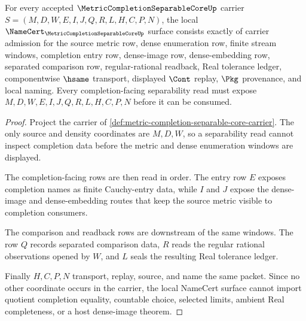 \begin{theorem}
\label{thm:metric-completion-separable-core-namecert-obligations}
For every accepted $\MetricCompletionSeparableCoreUp$ carrier $S=(M,D,W,E,I,J,Q,R,L,H,C,P,N)$, the local $\NameCert_{\MetricCompletionSeparableCoreUp}$ surface consists exactly of carrier admission for the source metric row, dense enumeration row, finite stream windows, completion entry row, dense-image row, dense-embedding row, separated comparison row, regular-rational readback, Real tolerance ledger, componentwise $\hsame$ transport, displayed $\Cont$ replay, $\Pkg$ provenance, and local naming. Every completion-facing separability read must expose $M,D,W,E,I,J,Q,R,L,H,C,P,N$ before it can be consumed.
\end{theorem}
\begin{proof}
Project the carrier of \autoref{def:metric-completion-separable-core-carrier}. The only source and density coordinates are $M,D,W$, so a separability read cannot inspect completion data before the metric and dense enumeration windows are displayed.

The completion-facing rows are then read in order. The entry row $E$ exposes completion names as finite Cauchy-entry data, while $I$ and $J$ expose the dense-image and dense-embedding routes that keep the source metric visible to completion consumers.

The comparison and readback rows are downstream of the same windows. The row $Q$ records separated comparison data, $R$ reads the regular rational observations opened by $W$, and $L$ seals the resulting Real tolerance ledger.

Finally $H,C,P,N$ transport, replay, source, and name the same packet. Since no other coordinate occurs in the carrier, the local NameCert surface cannot import quotient completion equality, countable choice, selected limits, ambient Real completeness, or a host dense-image theorem.
\end{proof}

